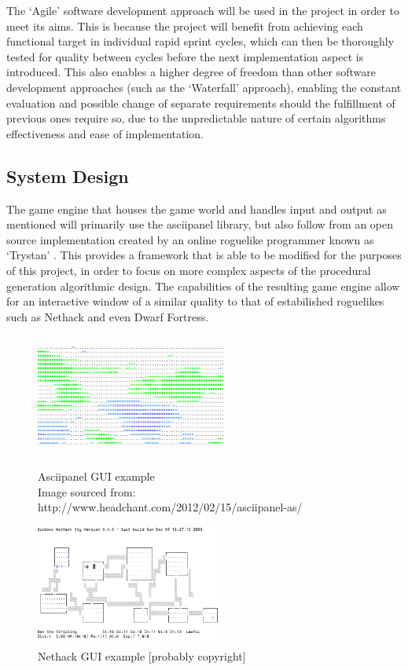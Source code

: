 \documentclass[12pt,a4paper]{article}
\begin{document}
The `Agile' software development approach will be used in the project in order to meet its aims. This is because the project will benefit from achieving each functional target in individual rapid sprint cycles, which can then be thoroughly tested for quality between cycles before the next implementation aspect is introduced. This also enables a higher degree of freedom than other software development approaches (such as the `Waterfall' approach), enabling the constant evaluation and possible change of separate requirements should the fulfillment of previous ones require so, due to the unpredictable nature of certain algorithms effectiveness and ease of implementation.


\subsection{System Design}

The game engine that houses the game world and handles input and output as mentioned will primarily use the asciipanel library, but also follow from an open source implementation created by an online roguelike programmer known as `Trystan' \cite{trystan}. This provides a framework that is able to be modified for the purposes of this project, in order to focus on more complex aspects of the procedural generation algorithmic design. The capabilities of the resulting game engine allow for an interactive window of a similar quality to that of estabilished roguelikes such as Nethack and even Dwarf Fortress. 


\begin{figure}[h]
\begin{minipage}{.5\textwidth}
  \centering
 	\includegraphics[width=6.25cm,height=4cm]{images/asciipanel1inv.png}
	\caption[]{Asciipanel GUI example \\ Image sourced from: \\http://www.headchant.com/2012/02/15/asciipanel-as/}
	\label{fig:fig1}
\end{minipage}
\begin{minipage}{.5\textwidth}
  \centering
  \includegraphics[width=6.25cm, height=4cm]{images/nethack2.png}
  \caption[]{Nethack GUI example [probably copyright]}
  \label{fig:fig2}
\end{minipage}
\end{figure}
\end{document}
